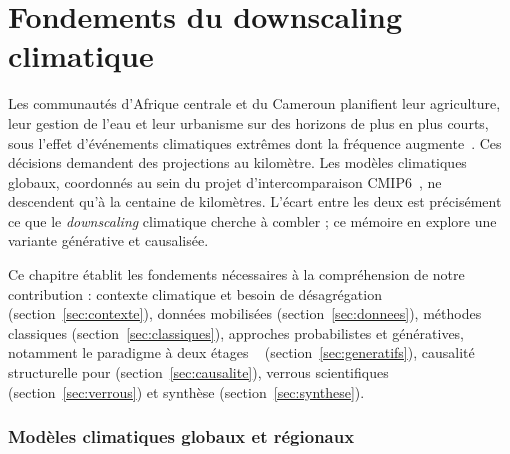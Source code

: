 \chapter{Fondements du downscaling climatique}
\label{chap:fondements}


\vspace{1.5em}

\label{sec:intro}

Les communautés d'Afrique centrale et du Cameroun planifient leur agriculture, leur gestion de l'eau et leur urbanisme sur des horizons de plus en plus courts, sous l'effet d'événements climatiques extrêmes dont la fréquence augmente~\cite{ipcc_ar6_2021}. Ces décisions demandent des projections au kilomètre. Les modèles climatiques globaux, coordonnés au sein du projet d'intercomparaison CMIP6~\cite{eyring_cmip6_2016}, ne descendent qu'à la centaine de kilomètres. L'écart entre les deux est précisément ce que le \emph{downscaling} climatique cherche à combler ; ce mémoire en explore une variante générative et causalisée.

Ce chapitre établit les fondements nécessaires à la compréhension de notre contribution : contexte climatique et besoin de désagrégation (section~\ref{sec:contexte}), données mobilisées (section~\ref{sec:donnees}), méthodes classiques (section~\ref{sec:classiques}), approches probabilistes et génératives, notamment le paradigme à deux étages \CorrDiff{}~\cite{mardani_corrdiff_2023} (section~\ref{sec:generatifs}), causalité structurelle pour \Oracle{} (section~\ref{sec:causalite}), verrous scientifiques (section~\ref{sec:verrous}) et synthèse (section~\ref{sec:synthese}).

\label{sec:contexte}

\subsection{Modèles climatiques globaux et régionaux}
\label{ssec:gcm-rcm}


